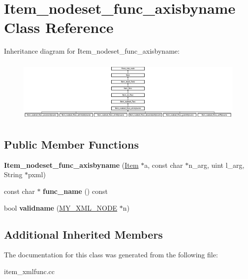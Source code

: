 \hypertarget{classItem__nodeset__func__axisbyname}{}\section{Item\+\_\+nodeset\+\_\+func\+\_\+axisbyname Class Reference}
\label{classItem__nodeset__func__axisbyname}
Inheritance diagram for Item\+\_\+nodeset\+\_\+func\+\_\+axisbyname\+:\begin{figure}[H]
\begin{center}
\leavevmode
\includegraphics[height=3.098202cm]{classItem__nodeset__func__axisbyname}
\end{center}
\end{figure}
\subsection*{Public Member Functions}
\begin{DoxyCompactItemize}
\item 
\mbox{\label{classItem__nodeset__func__axisbyname_acb716b5980a419b01ca9ef700cb79eae}} 
{\bfseries Item\+\_\+nodeset\+\_\+func\+\_\+axisbyname} (\mbox{\hyperlink{classItem}{Item}} $\ast$a, const char $\ast$n\+\_\+arg, uint l\+\_\+arg, String $\ast$pxml)
\item 
\mbox{\label{classItem__nodeset__func__axisbyname_a7f874b49a55c56a0d295fc4c82b8d819}} 
const char $\ast$ {\bfseries func\+\_\+name} () const
\item 
\mbox{\label{classItem__nodeset__func__axisbyname_a3064e033147877a150612b032a27e56e}} 
bool {\bfseries validname} (\mbox{\hyperlink{structmy__xml__node__st}{M\+Y\+\_\+\+X\+M\+L\+\_\+\+N\+O\+DE}} $\ast$n)
\end{DoxyCompactItemize}
\subsection*{Additional Inherited Members}


The documentation for this class was generated from the following file\+:\begin{DoxyCompactItemize}
\item 
item\+\_\+xmlfunc.\+cc\end{DoxyCompactItemize}

